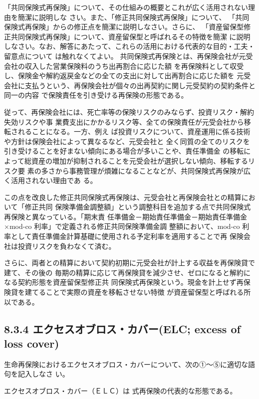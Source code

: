 \documentclass[report,gutter=10mm,fore-edge=10mm,uplatex,dvipdfmx]{jlreq}
\begin{document}
「共同保険式再保険」について、その仕組みの概要とこれが広く活用されない理由を簡潔に説明しな
さい。また、「修正共同保険式再保険」について、
「共同保険式再保険」からの修正点を簡潔に説明しなさい。さらに、
「資産留保型修正共同保険式再保険」について、資産留保型と呼ばれるその特徴を簡潔
に説明しなさい。なお、解答にあたって、これらの活用における代表的な目的・工夫・留意点について
は触れなくてよい。
\answer{}
共同保険式再保険とは、再保険会社が元受会社の収入した営業保険料のうち出再割合に応じた額
を再保険料として収受し、保険金や解約返戻金などの全ての支出に対して出再割合に応じた額を
元受会社に支払うという、再保険会社が個々の出再契約に関し元受契約の契約条件と同一の内容
で保険責任を引き受ける再保険の形態である。

従って、再保険会社には、死亡率等の保険リスクのみならず、投資リスク・解約失効リスクや事
業費支出にかかるリスク等、全ての保険責任が元受会社から移転されることになる。一方、例え
ば投資リスクについて、資産運用に係る技術や方針は保険会社によって異なるなど、元受会社と
全く同質の全てのリスクを引き受けることを好まない傾向にある場合が多いことや、責任準備金
の移転によって総資産の増加が抑制されることを元受会社が選択しない傾向、移転するリスク要
素の多さから事務管理が煩雑になることなどが、共同保険式再保険が広く活用されない理由であ
る。

この点を改良した修正共同保険式再保険は、元受会社と再保険会社との精算において「修正共同
保険準備金調整額」という調整科目を追加する点で共同保険式再保険と異なっている。「期末責
任準備金－期始責任準備金－期始責任準備金×mod-co 利率」で定義される修正共同保険準備金調
整額において、mod-co 利率として責任準備金計算基礎に使用される予定利率を適用することで再
保険会社は投資リスクを負わなくて済む。

さらに、両者との精算において契約初期に元受会社が計上する収益を再保険貸で建て、その後の
毎期の精算に応じて再保険貸を減少させ、ゼロになると解約になる契約形態を資産留保型修正共
同保険式再保険という。現金を計上せず再保険貸を建てることで実際の資産を移転させない特徴
が資産留保型と呼ばれる所以である。

\subsection{8.3.4 エクセスオブロス・カバー(ELC; excess of loss cover)}

生命再保険におけるエクセスオブロス・カバーについて、次の①～⑤に適切な語句を記入しなさ
い。

エクセスオブロス・カバー（ＥＬＣ）は
式再保険の代表的な形態である。
\end{document}
